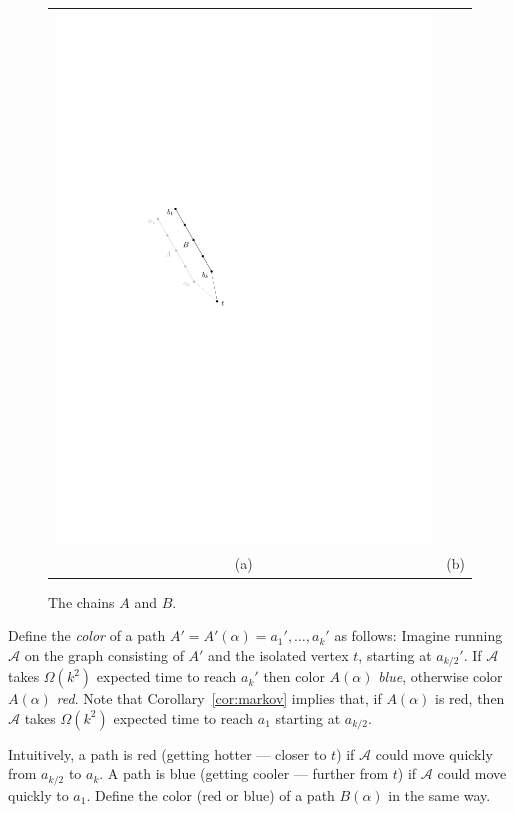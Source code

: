 \documentclass{elsarticle}
\begin{document}
\begin{figure}
\begin{center}
\begin{tabular}{cc}
      \includegraphics{pics/bchain} \\
      (a) & (b)
    \end{tabular}
  \end{center}
  \caption{The chains $A$ and $B$.}
  \label{fig:ab}
\end{figure}

Define the \emph{color} of a path $A'=A'(\alpha)=a_1',\ldots,a_k'$ as
follows: Imagine running $\mathcal{A}$ on the graph consisting of $A'$
and the isolated vertex $t$, starting at $a_{k/2}'$.  If $\mathcal{A}$
takes $\Omega (k^{2})$ expected time to reach $a_k'$ then color
$A(\alpha)$ \emph{blue}, otherwise color $A(\alpha)$ \emph{red}.
Note that Corollary~\ref{cor:markov} implies that, if $A(\alpha)$ is red,
then $\mathcal{A}$ takes $\Omega(k^2)$ expected time to reach $a_1$
starting at $a_{k/2}$.

Intuitively, a path is red (getting hotter --- closer to $t$) if
$\mathcal{A}$ could move quickly from $a_{k/2}$ to $a_k$.  A path is blue (getting cooler --- further from $t$) if $\mathcal{A}$ could move quickly to $a_1$.  Define the color (red or blue) of a path $B(\alpha)$ in the same way.
\end{document}
